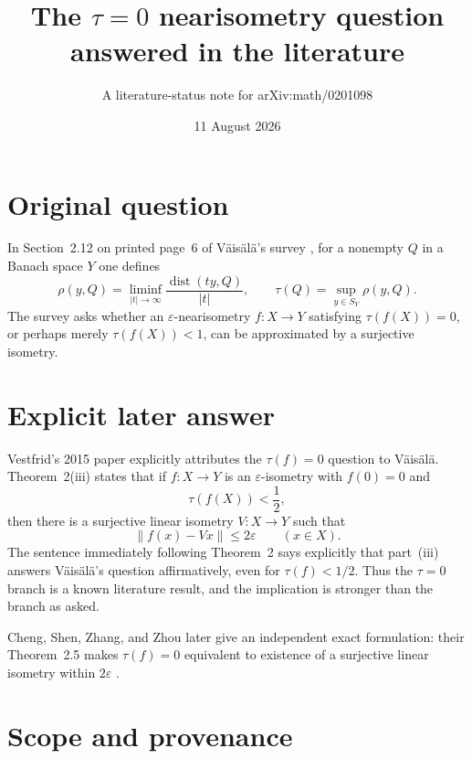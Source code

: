 \documentclass[11pt]{article}
\title{The $\tau=0$ nearisometry question\\answered in the literature}
\author{A literature-status note for arXiv:math/0201098}
\date{11 August 2026}
\begin{document}
\maketitle

\begin{center}
\end{center}

\section*{Original question}

In Section~2.12 on printed page~6 of V\"ais\"al\"a's survey
\cite{Vaisala}, for a nonempty $Q$ in a Banach space $Y$ one defines
\[
 \rho(y,Q)=\liminf_{|t|\to\infty}\frac{\operatorname{dist}(ty,Q)}{|t|},
 \qquad
 \tau(Q)=\sup_{y\in S_Y}\rho(y,Q).
\]
The survey asks whether an $\varepsilon$-nearisometry $f:X\to Y$ satisfying
$\tau(f(X))=0$, or perhaps merely $\tau(f(X))<1$, can be approximated by a
surjective isometry.

\section*{Explicit later answer}

Vestfrid's 2015 paper \cite{Vestfrid} explicitly attributes the
$\tau(f)=0$ question to V\"ais\"al\"a.  Theorem~2(iii) states that if
$f:X\to Y$ is an $\varepsilon$-isometry with $f(0)=0$ and
\[
 \tau(f(X))<\frac12,
\]
then there is a surjective linear isometry $V:X\to Y$ such that
\[
 \|f(x)-Vx\|\leq 2\varepsilon\qquad(x\in X).
\]
The sentence immediately following Theorem~2 says explicitly that part~(iii)
answers V\"ais\"al\"a's question affirmatively, even for
$\tau(f)<1/2$.  Thus the $\tau=0$ branch is a known literature result, and
the implication is stronger than the branch as asked.

Cheng, Shen, Zhang, and Zhou later give an independent exact formulation:
their Theorem~2.5 makes $\tau(f)=0$ equivalent to existence of a surjective
linear isometry within $2\varepsilon$ \cite{CSZZ}.

\section*{Scope and provenance}
\end{document}
